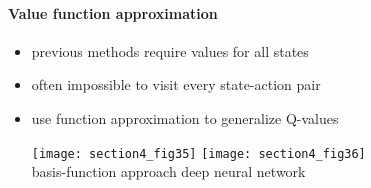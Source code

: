 \paragraph{Value function approximation}
	\begin{itemize}
		\item previous methods require values for all states
		\vspace{4mm}
		\item often impossible to visit every state-action pair
		\vspace{4mm}
		\item use function approximation to generalize Q-values
			 \vspace{.5mm}
		\begin{center}
			\texttt{[image: section4\_fig35]}
			 \hspace{2cm}
			\texttt{[image: section4\_fig36]} \\
			basis-function approach 
			\hspace{20mm}
			deep neural network
			\hspace{14mm}$ $
		\end{center}
	\end{itemize}
